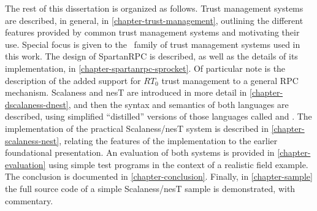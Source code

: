 The rest of this dissertation is organized as follows. Trust management systems are described,
in general, in \autoref{chapter-trust-management}, outlining the different features provided by
common trust management systems and motivating their use. Special focus is given to the \RT\
family of trust management systems used in this work. The design of SpartanRPC is described, as
well as the details of its implementation, in \autoref{chapter-spartanrpc-sprocket}. Of
particular note is the description of the added support for $RT_0$ trust management to a general
RPC mechanism. Scalaness and nesT are introduced in more detail in
\autoref{chapter-dscalaness-dnest}, and then the syntax and semantics of both languages are
described, using simplified ``distilled'' versions of those languages called
\newterm{DScalaness} and \newterm{DnesT}. The implementation of the practical Scalaness/nesT
system is described in \autoref{chapter-scalaness-nest}, relating the features of the
implementation to the earlier foundational presentation. An evaluation of both systems is
provided in \autoref{chapter-evaluation} using simple test programs in the context of a
realistic field example. The conclusion is documented in \autoref{chapter-conclusion}. Finally,
in \autoref{chapter-sample} the full source code of a simple Scalaness/nesT sample is
demonstrated, with commentary.

